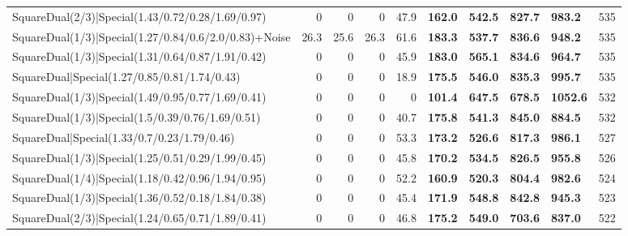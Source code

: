 \begin{tabular}{lrrrrllllr}
 SquareDual(2/3)|Special(1.43/0.72/0.28/1.69/0.97)       &          0   &          0   &          0   &            47.9 & \textbf{162.0} & \textbf{542.5} & \textbf{827.7} & \textbf{983.2}  &          535 \\
 SquareDual(1/3)|Special(1.27/0.84/0.6/2.0/0.83)+Noise   &         26.3 &         25.6 &         26.3 &            61.6 & \textbf{183.3} & \textbf{537.7} & \textbf{836.6} & \textbf{948.2}  &          535 \\
 SquareDual(1/3)|Special(1.31/0.64/0.87/1.91/0.42)       &          0   &          0   &          0   &            45.9 & \textbf{183.0} & \textbf{565.1} & \textbf{834.6} & \textbf{964.7}  &          535 \\
 SquareDual|Special(1.27/0.85/0.81/1.74/0.43)            &          0   &          0   &          0   &            18.9 & \textbf{175.5} & \textbf{546.0} & \textbf{835.3} & \textbf{995.7}  &          535 \\
 SquareDual(1/3)|Special(1.49/0.95/0.77/1.69/0.41)       &          0   &          0   &          0   &             0   & \textbf{101.4} & \textbf{647.5} & \textbf{678.5} & \textbf{1052.6} &          532 \\
 SquareDual(1/3)|Special(1.5/0.39/0.76/1.69/0.51)        &          0   &          0   &          0   &            40.7 & \textbf{175.8} & \textbf{541.3} & \textbf{845.0} & \textbf{884.5}  &          532 \\
 SquareDual|Special(1.33/0.7/0.23/1.79/0.46)             &          0   &          0   &          0   &            53.3 & \textbf{173.2} & \textbf{526.6} & \textbf{817.3} & \textbf{986.1}  &          527 \\
 SquareDual(1/3)|Special(1.25/0.51/0.29/1.99/0.45)       &          0   &          0   &          0   &            45.8 & \textbf{170.2} & \textbf{534.5} & \textbf{826.5} & \textbf{955.8}  &          526 \\
 SquareDual(1/4)|Special(1.18/0.42/0.96/1.94/0.95)       &          0   &          0   &          0   &            52.2 & \textbf{160.9} & \textbf{520.3} & \textbf{804.4} & \textbf{982.6}  &          524 \\
 SquareDual(1/3)|Special(1.36/0.52/0.18/1.84/0.38)       &          0   &          0   &          0   &            45.4 & \textbf{171.9} & \textbf{548.8} & \textbf{842.8} & \textbf{945.3}  &          523 \\
 SquareDual(2/3)|Special(1.24/0.65/0.71/1.89/0.41)       &          0   &          0   &          0   &            46.8 & \textbf{175.2} & \textbf{549.0} & \textbf{703.6} & \textbf{837.0}  &          522 \\

\end{tabular}
